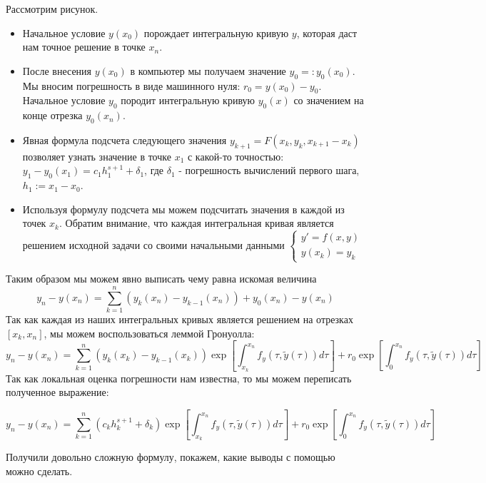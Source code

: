 Рассмотрим рисунок.
\begin{itemize}
  \item Начальное условие $y(x_0)$ порождает интегральную кривую
        $y$, которая даст нам точное решение в точке $x_n$.
  \item После внесения $y(x_0)$ в компьютер мы получаем значение $y_0=:y_0(x_0)$.
        Мы вносим погрешность в виде машинного нуля: $r_0=y(x_0)-y_0$.
        Начальное условие $y_0$ породит интегральную кривую
        $y_0(x)$ со значением на конце отрезка $y_0(x_n)$.
  \item Явная формула подсчета следующего значения $y_{k+1}=F(x_k,y_k,x_{k+1}-x_k)$
        позволяет узнать значение в точке $x_1$ с какой-то точностью:
        $y_1-y_0(x_1)=c_1h_1^{s+1}+\delta_1$, где $\delta_1$ - погрешность вычислений первого шага, $h_1:=x_1-x_0$.
  \item Используя формулу подсчета мы можем подсчитать значения в каждой из точек $x_k$.
        Обратим внимание, что каждая интегральная кривая является решением исходной задачи
        со своими начальными данными $\begin{cases}
            y'=f(x,y) \\ y(x_k)=y_k
          \end{cases}$
\end{itemize}
Таким образом мы можем явно выписать чему равна искомая величина
\[y_n-y(x_n)=\sum_{k=1}^n(y_k(x_n)-y_{k-1}(x_n))+y_0(x_n)-y(x_n)\]
Так как каждая из наших интегральных кривых является решением на отрезках $[x_k,x_n]$,
мы можем воспользоваться леммой Гронуолла:
\[y_n-y(x_n)=\sum_{k=1}^n(y_k(x_k)-y_{k-1}(x_k))\exp\left[\int_{x_k}^{x_n}f_y(\tau,\tilde{y}(\tau))d\tau\right]+r_0\exp\left[\int_{0}^{x_n}f_y(\tau,\tilde{y}(\tau))d\tau\right]\]
Так как локальная оценка погрешности нам известна, то мы можем переписать полученное выражение:

\begin{equation}\label{eq:global_approx}
  y_n-y(x_n)=\sum_{k=1}^n(c_kh_k^{s+1}+\delta_k)\exp\left[\int_{x_k}^{x_n}f_y(\tau,\tilde{y}(\tau))d\tau\right]+r_0\exp\left[\int_{0}^{x_n}f_y(\tau,\tilde{y}(\tau))d\tau\right]
\end{equation}

Получили довольно сложную формулу, покажем, какие выводы с помощью можно сделать.

